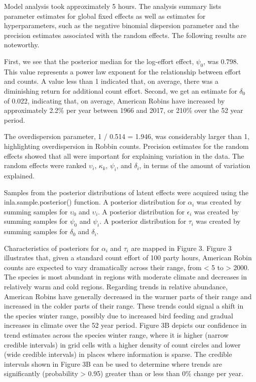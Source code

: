 \documentclass[]{article}
\begin{document}
Model analysis took approximately 5 hours.  The analysis summary lists parameter estimates for global fixed effects as well as estimates for hyperparameters, such as the negative binomial dispersion parameter and the precision estimates associated with the random effects. The following results are noteworthy.

First, we see that the posterior median for the log-effort effect, $\psi_0$, was 0.798. This value represents a power law exponent for the relationship between effort and counts.  A value less than 1 indicated that, on average, there was a diminishing return for additional count effort. Second, we get an estimate for $\delta_0$ of 0.022, indicating that, on average, American Robins have increased by approximately 2.2\% per year between 1966 and 2017, or 210\% over the 52 year period. 

The overdispersion parameter, 1 / 0.514 = 1.946, was considerably larger than 1, highlighting overdispersion in Robbin counts. Precision estimates for the random effects showed that all were important for explaining variation in the data. The random effects were ranked $\upsilon_i$, $\kappa_k$, $\psi_i$, and $\delta_i$, in terms of the amount of variation explained.

Samples from the posterior distributions of latent effects were acquired using the inla.sample.posterior() function. A posterior distribution for $\alpha_i$ was created by summing samples for $\upsilon_0$ and $\upsilon_i$. A posterior distribution for $\epsilon_i$ was created by summing samples for $\psi_0$ and $\psi_i$. A posterior distribution for $\tau_i$ was created by summing samples for $\delta_0$ and $\delta_i$.

Characteristics of posteriors for $\alpha_i$ and $\tau_i$ are mapped in Figure 3. Figure 3 illustrates that, given a standard count effort of 100 party hours, American Robin counts are expected to vary dramatically across their range, from < 5 to > 2000. The species is most abundant in regions with moderate climate and decreases in relatively warm and cold regions. Regarding trends in relative abundance, American Robins have generally decreased in the warmer parts of their range and increased in the colder parts of their range.  These trends could signal a shift in the species winter range, possibly due to increased bird feeding and gradual increases in climate over the 52 year period. Figure 3B depicts our confidence in trend estimates across the species winter range, where it is higher (narrow credible intervals) in grid cells with a higher density of count circles and lower (wide credible intervals) in places where information is sparse. The credible intervals shown in Figure 3B can be used to determine where trends are significantly (probability > 0.95) greater than or less than 0\% change per year. 
\end{document}
